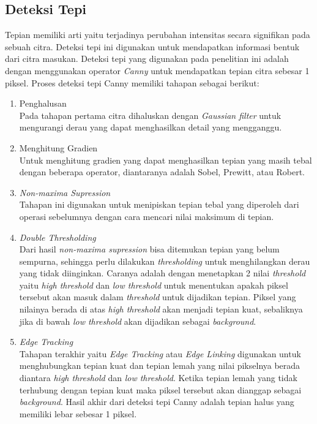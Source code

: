 \subsection{Deteksi Tepi}
\noindent Tepian memiliki arti yaitu terjadinya perubahan intensitas secara signifikan pada sebuah citra. Deteksi tepi ini digunakan untuk mendapatkan informasi bentuk dari citra masukan. Deteksi tepi yang digunakan pada penelitian ini adalah dengan menggunakan operator \textit{Canny} untuk mendapatkan tepian citra sebesar 1 piksel. Proses deteksi tepi Canny memiliki tahapan sebagai berikut:
\begin{enumerate}
	\item Penghalusan \\
	Pada tahapan pertama citra dihaluskan dengan \textit{Gaussian filter} untuk mengurangi derau yang dapat menghasilkan detail yang mengganggu.
	\item Menghitung Gradien \\
	Untuk menghitung gradien yang dapat menghasilkan tepian yang masih tebal dengan beberapa operator, diantaranya adalah Sobel, Prewitt, atau Robert.
	\item \textit{Non-maxima Supression} \\
	Tahapan ini digunakan untuk menipiskan tepian tebal yang diperoleh dari operasi sebelumnya dengan cara mencari nilai maksimum di tepian.
	\item \textit{Double Thresholding} \\
	Dari hasil \textit{non-maxima supression} bisa ditemukan tepian yang belum sempurna, sehingga perlu dilakukan \textit{thresholding} untuk menghilangkan derau yang tidak diinginkan. Caranya adalah dengan menetapkan 2 nilai \textit{threshold} yaitu \textit{high threshold} dan \textit{low threshold} untuk menentukan apakah piksel tersebut akan masuk dalam \textit{threshold} untuk dijadikan tepian. Piksel yang nilainya berada di atas \textit{high threshold} akan menjadi tepian kuat, sebaliknya jika di bawah \textit{low threshold} akan dijadikan sebagai \textit{background}.
	\item \textit{Edge Tracking} \\
	Tahapan terakhir yaitu \textit{Edge Tracking} atau \textit{Edge Linking} digunakan untuk menghubungkan tepian kuat dan tepian lemah yang nilai pikselnya berada diantara \textit{high threshold} dan \textit{low threshold}. Ketika tepian lemah yang tidak terhubung dengan tepian kuat maka piksel tersebut akan dianggap sebagai \textit{background}. Hasil akhir dari deteksi tepi Canny adalah tepian halus yang memiliki lebar sebesar 1 piksel.\\
\end{enumerate} 

